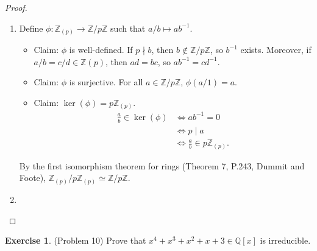 \documentclass[12pt, psamsfonts]{amsart}
\theoremstyle{definition}
\newtheorem*{exer}{Exercise}
\theoremstyle{remark}
\numberwithin{equation}{section}
\begin{document}
\begin{proof}
  $ $
  \begin{enumerate}[label=(\roman*)]
    \item
      Define $\phi: \mathbb{Z}_{(p)} \rightarrow \mathbb{Z}/p\mathbb{Z}$ such that $a / b \mapsto ab^{-1}$.
      \begin{itemize}
        \item
          Claim: $\phi$ is well-defined.
          If $p \nmid b$, then $b \notin \mathbb{Z}/p\mathbb{Z}$, so $b^{-1}$ exists.
          Moreover, if $a / b = c / d \in \mathbb{Z}(p)$, then $ad = bc$, so $ab^{-1} = cd^{-1}$.
        \item
          Claim: $\phi$ is surjective.
          For all $a \in \mathbb{Z}/p\mathbb{Z}$, $\phi(a / 1) = a$.
        \item
          Claim: $\ker(\phi) = p\mathbb{Z}_{(p)}$.
          \begin{align*}
            \frac{a}{b} \in \ker(\phi)
              &\iff ab^{-1} = 0 \\
              &\iff p \mid a \\
              &\iff \frac{a}{b} \in p\mathbb{Z}_{(p)}.
          \end{align*}
      \end{itemize}
      By the first isomorphism theorem for rings (Theorem 7, P.243, Dummit and Foote), $\mathbb{Z}_{(p)} / p\mathbb{Z}_{(p)} \simeq \mathbb{Z}/p\mathbb{Z} $.
    \item
  \end{enumerate}
\end{proof}

\begin{exer}{(Problem 10)}
  Prove that $x^4 + x^3 + x^2 + x + 3 \in \mathbb{Q}[x]$ is irreducible.
\end{exer}
\end{document}
